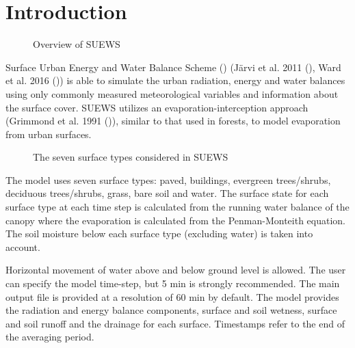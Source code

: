 \documentclass[letterpaper,10pt,english]{sphinxmanual}
\begin{document}


\chapter{Introduction}
\label{\detokenize{introduction:introduction}}\label{\detokenize{introduction::doc}}
\begin{figure}[htbp]
\centering
\capstart

\noindent{}
\caption{Overview of SUEWS}\label{\detokenize{introduction:id4}}\end{figure}

Surface Urban Energy and Water Balance Scheme () (Järvi et al.
2011 \label{\detokenize{introduction:id1}}{\hyperref[\detokenize{references:j11}]{\sphinxcrossref{{[}J11{]}}}} (), Ward et al. 2016 \label{\detokenize{introduction:id2}}{\hyperref[\detokenize{references:w16}]{\sphinxcrossref{{[}W16{]}}}} ()) is able to simulate the urban
radiation, energy and water balances using only commonly measured
meteorological variables and information about the surface cover. SUEWS
utilizes an evaporation-interception approach (Grimmond et al.
1991 \label{\detokenize{introduction:id3}}{\hyperref[\detokenize{references:g91}]{\sphinxcrossref{{[}G91{]}}}} ()), similar to that used in forests, to model evaporation from
urban surfaces.

\begin{figure}[htbp]
\centering
\capstart

\noindent{}
\caption{The seven surface types considered in SUEWS}\label{\detokenize{introduction:id5}}\end{figure}

The model uses seven surface types: paved, buildings, evergreen
trees/shrubs, deciduous trees/shrubs, grass, bare soil and water. The
surface state for each surface type at each time step is calculated from
the running water balance of the canopy where the evaporation is
calculated from the Penman-Monteith equation. The soil moisture below
each surface type (excluding water) is taken into account.

Horizontal movement of water above and below ground level is allowed.
The user can specify the model time-step, but 5 min is strongly
recommended. The main output file is provided at a resolution of 60 min
by default. The model provides the radiation and energy balance
components, surface and soil wetness, surface and soil runoff and the
drainage for each surface. Timestamps refer to the end of the averaging
period.
\end{document}
